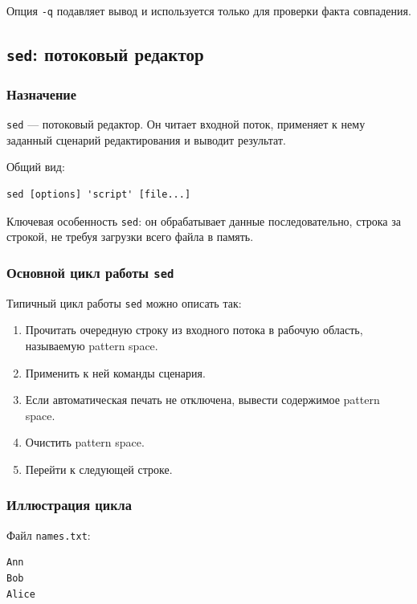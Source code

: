 \documentclass[12pt,a4paper]{article}
\begin{document}
Опция \texttt{-q} подавляет вывод и используется только для проверки факта совпадения.

\subsection{\texttt{sed}: потоковый редактор}

\subsubsection{Назначение}

\texttt{sed} --- потоковый редактор. Он читает входной поток, применяет к нему заданный сценарий редактирования и выводит результат.

Общий вид:

\begin{verbatim}
sed [options] 'script' [file...]
\end{verbatim}

Ключевая особенность \texttt{sed}: он обрабатывает данные последовательно, строка за строкой, не требуя загрузки всего файла в память.

\subsubsection{Основной цикл работы \texttt{sed}}

Типичный цикл работы \texttt{sed} можно описать так:

\begin{enumerate}
    \item Прочитать очередную строку из входного потока в рабочую область, называемую pattern space.
    \item Применить к ней команды сценария.
    \item Если автоматическая печать не отключена, вывести содержимое pattern space.
    \item Очистить pattern space.
    \item Перейти к следующей строке.
\end{enumerate}

\subsubsection{Иллюстрация цикла}

Файл \texttt{names.txt}:

\begin{verbatim}
Ann
Bob
Alice
\end{verbatim}
\end{document}
